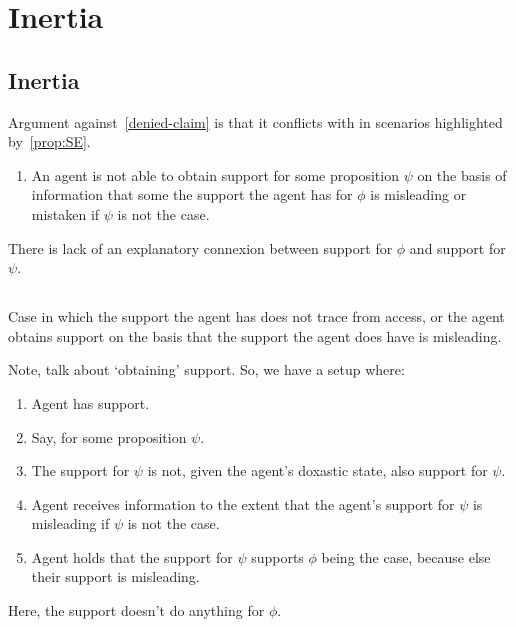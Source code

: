 \chapter{Inertia}
\label{cha:inertia}

\section{Inertia}
\label{sec:inertia}

Argument against~\ref{denied-claim} is that it conflicts with \nI{-} in scenarios highlighted by~\ref{prop:SE}.

\begin{enumerate}[label=\nI{}, ref=\nI{}]
\item An agent is not able to obtain support for some proposition \(\psi\) on the basis of information that some the support the agent has for \(\phi\) is misleading or mistaken if \(\psi\) is not the case.
\end{enumerate}

There is lack of an explanatory connexion between support for \(\phi\) and support for \(\psi\).

\section{\nI{}}
\label{sec:ni}

Case in which the support the agent has does not trace from access, or the agent obtains support on the basis that the support the agent does have is misleading.

Note, talk about `obtaining' support.
So, we have a setup where:

\begin{enumerate}
\item Agent has support.
\item Say, for some proposition \(\psi\).
\item The support for \(\psi\) is not, given the agent's doxastic state, also support for \(\psi\).
\item Agent receives information to the extent that the agent's support for \(\psi\) is misleading if \(\psi\) is not the case.
\item Agent holds that the support for \(\psi\) supports \(\phi\) being the case, because else their support is misleading.
\end{enumerate}

Here, the support doesn't do anything for \(\phi\).

